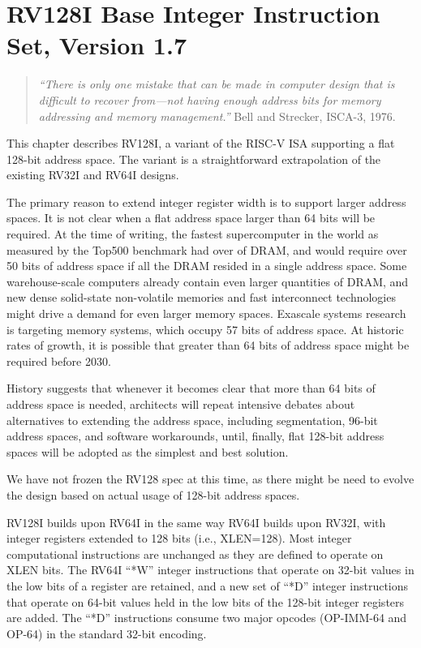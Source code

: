\chapter{RV128I Base Integer Instruction Set, Version 1.7}
\label{rv128}

\begin{quote}
{\em ``There is only one mistake that can be made in computer design that is
difficult to recover from---not having enough address bits for memory
addressing and memory management.''} Bell and Strecker, ISCA-3, 1976.
\end{quote}

This chapter describes RV128I, a variant of the RISC-V ISA
supporting a flat 128-bit address space.  The variant is a
straightforward extrapolation of the existing RV32I and RV64I designs.

\begin{commentary}
The primary reason to extend integer register width is to support
larger address spaces.  It is not clear when a flat address space larger
than 64 bits will be required.  At the time of writing, the fastest
supercomputer in the world as measured by the Top500 benchmark had
over  of DRAM, and would require over 50 bits of address
space if all the DRAM resided in a single address space.  Some
warehouse-scale computers already contain even larger quantities of
DRAM, and new dense solid-state non-volatile memories and fast
interconnect technologies might drive a demand for even larger memory
spaces.  Exascale systems research is targeting 
memory systems, which occupy 57 bits of address space.  At historic
rates of growth, it is possible that greater than 64 bits of address
space might be required before 2030.

History suggests that whenever it becomes clear that more than 64 bits
of address space is needed, architects will repeat intensive debates
about alternatives to extending the address space, including
segmentation, 96-bit address spaces, and software workarounds, until,
finally, flat 128-bit address spaces will be adopted as the simplest
and best solution.

We have not frozen the RV128 spec at this time, as there might be need
to evolve the design based on actual usage of 128-bit address spaces.
\end{commentary}

RV128I builds upon RV64I in the same way RV64I builds upon RV32I, with
integer registers extended to 128 bits (i.e., XLEN=128).  Most integer
computational instructions are unchanged as they are defined to
operate on XLEN bits.  The RV64I ``*W'' integer instructions that
operate on 32-bit values in the low bits of a register are retained,
and a new set of ``*D'' integer instructions that operate on 64-bit
values held in the low bits of the 128-bit integer registers are
added.  The ``*D'' instructions consume two major opcodes (OP-IMM-64
and OP-64) in the standard 32-bit encoding.

